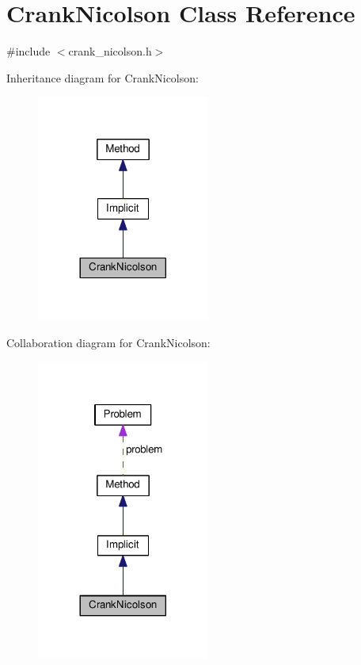 \hypertarget{classCrankNicolson}{}\section{Crank\+Nicolson Class Reference}
\label{classCrankNicolson}


{\ttfamily \#include $<$crank\+\_\+nicolson.\+h$>$}



Inheritance diagram for Crank\+Nicolson\+:
\nopagebreak
\begin{figure}[H]
\begin{center}
\leavevmode
\includegraphics[width=161pt]{classCrankNicolson__inherit__graph}
\end{center}
\end{figure}


Collaboration diagram for Crank\+Nicolson\+:
\nopagebreak
\begin{figure}[H]
\begin{center}
\leavevmode
\includegraphics[width=161pt]{classCrankNicolson__coll__graph}
\end{center}
\end{figure}
